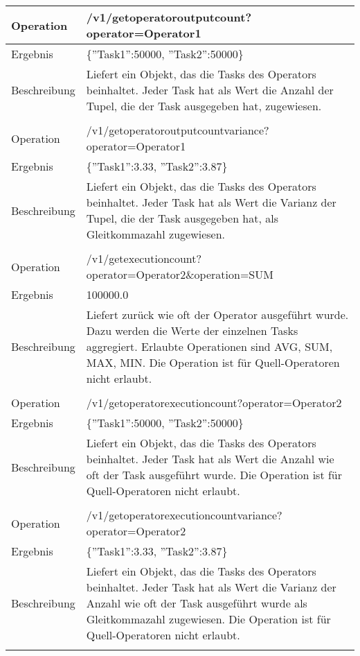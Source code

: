 \begin{longtable}{|p{2cm}|p{12cm}|}
Operation & /v1/getoperatoroutputcount?operator=Operator1 \\ \hline
Ergebnis & \{''Task1'':50000, ''Task2'':50000\} \\ \hline
Beschreibung & Liefert ein Objekt, das die Tasks des Operators beinhaltet. Jeder Task hat als Wert die Anzahl der Tupel, die der Task ausgegeben hat, zugewiesen. \\ \hline
\multicolumn{2}{|l|}{} \\ \hline

Operation & /v1/getoperatoroutputcountvariance?operator=Operator1 \\ \hline
Ergebnis & \{''Task1'':3.33, ''Task2'':3.87\} \\ \hline
Beschreibung & Liefert ein Objekt, das die Tasks des Operators beinhaltet. Jeder Task hat als Wert die Varianz der Tupel, die der Task ausgegeben hat, als Gleitkommazahl zugewiesen. \\ \hline
\multicolumn{2}{|l|}{} \\ \hline

Operation & /v1/getexecutioncount?operator=Operator2\&operation=SUM \\ \hline
Ergebnis & 100000.0 \\ \hline
Beschreibung & Liefert zurück wie oft der Operator ausgeführt wurde. Dazu werden die Werte der einzelnen Tasks aggregiert. Erlaubte Operationen sind AVG, SUM, MAX, MIN. Die Operation ist für Quell-Operatoren nicht erlaubt. \\ \hline
\multicolumn{2}{|l|}{} \\ \hline

Operation & /v1/getoperatorexecutioncount?operator=Operator2 \\ \hline
Ergebnis & \{''Task1'':50000, ''Task2'':50000\} \\ \hline
Beschreibung & Liefert ein Objekt, das die Tasks des Operators beinhaltet. Jeder Task hat als Wert die Anzahl wie oft der Task ausgeführt wurde. Die Operation ist für Quell-Operatoren nicht erlaubt. \\ \hline
\multicolumn{2}{|l|}{} \\ \hline

Operation & /v1/getoperatorexecutioncountvariance?operator=Operator2 \\ \hline
Ergebnis & \{''Task1'':3.33, ''Task2'':3.87\} \\ \hline
Beschreibung & Liefert ein Objekt, das die Tasks des Operators beinhaltet. Jeder Task hat als Wert die Varianz der Anzahl wie oft der Task ausgeführt wurde als Gleitkommazahl zugewiesen. Die Operation ist für Quell-Operatoren nicht erlaubt. \\ \hline
\multicolumn{2}{|l|}{} \\ \hline


\end{longtable}

